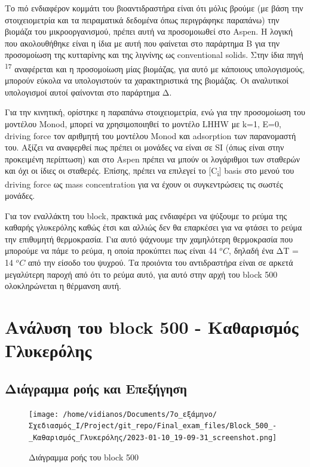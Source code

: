 \documentclass[11pt]{article}
\makeatletter
\newcommand{\citeprocitem}[2]{\hyper@linkstart{cite}{citeproc_bib_item_#1}#2\hyper@linkend}
\makeatother
\begin{document}
Το πιό ενδιαφέρον κομμάτι του βιοαντιδραστήρα είναι ότι μόλις βρούμε (με βάση την στοιχειομετρία και τα πειραματικά δεδομένα όπως περιγράφηκε παραπάνω) την βιομάζα του μικροοργανισμού, πρέπει αυτή να προσομοιωθεί στο Aspen. Η λογική που ακολουθήθηκε είναι η ίδια με αυτή που φαίνεται στο παράρτημα Β για την προσομοίωση της κυτταρίνης και της λιγνίνης ως conventional solids. Στην ίδια πηγή \textsuperscript{\citeprocitem{17}{17}} αναφέρεται και η προσομοίωση μίας βιομάζας, για αυτό με κάποιους υπολογισμούς, μπορούν εύκολα να υπολογιστούν τα χαρακτηριστικά της βιομάζας. Οι αναλυτικοί υπολογισμοί αυτοί φαίνονται στο παράρτημα Δ.

Για την κινητική, ορίστηκε η παραπάνω στοιχειομετρία, ενώ για την προσομοίωση του μοντέλου Monod, μπορεί να χρησιμοποιηθεί το μοντέλο LHHW με k=1, E=0, driving force τον αριθμητή του μοντέλου Monod και adsorption των παρανομαστή του. Αξίζει να αναφερθεί πως πρέπει οι μονάδες να είναι σε SI (όπως είναι στην προκειμένη περίπτωση) και στο Aspen πρέπει να μπούν οι λογάριθμοι των σταθερών και όχι οι ίδιες οι σταθερές. Επίσης, πρέπει να επιλεγεί το [C\textsubscript{i}] basis στο μενού του driving force ως mass concentration για να έχουν οι συγκεντρώσεις τις σωστές μονάδες.

Για τον εναλλάκτη του block, πρακτικά μας ενδιαφέρει να ψύξουμε το ρεύμα της καθαρής γλυκερόλης καθώς έτσι και αλλιώς δεν θα επαρκέσει για να φτάσει το ρεύμα την επιθυμητή θερμοκρασία. Για αυτό ψάχνουμε την χαμηλότερη θερμοκρασία που μπορούμε να πάμε το ρεύμα, η οποία προκύπτει πως είναι 44 \(^oC\), δηλαδή ένα ΔΤ = 14 \(^oC\) από την είσοδο του ψυχρού. Τα προιόντα του αντιδραστήρα είναι σε αρκετά μεγαλύτερη παροχή από ότι το ρεύμα αυτό, για αυτό στην αρχή του block 500 ολοκληρώνεται η θέρμανση αυτή.

\section{Ανάλυση του block 500 - Καθαρισμός Γλυκερόλης}
\label{sec:orgf807fa4}

\subsection{Διάγραμμα ροής και Επεξήγηση}
\label{sec:org9311cf4}
\begin{figure}[htbp]
\centering
\texttt{[image: /home/vidianos/Documents/7o\_εξάμηνο/Σχεδιασμός\_Ι/Project/git\_repo/Final\_exam\_files/Block\_500\_-\_Καθαρισμός\_Γλυκερόλης/2023-01-10\_19-09-31\_screenshot.png]}
\caption{Διάγραμμα ροής του block 500}
\end{figure}
\end{document}
